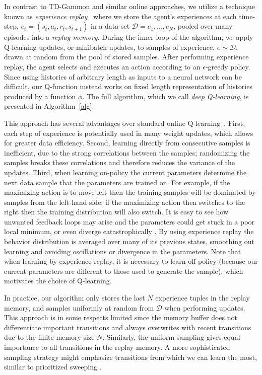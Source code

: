 \documentclass{article} %
\begin{document}
In contrast to TD-Gammon and similar online approaches, we utilize a technique known as \emph{experience replay}~\cite{lin1993reinforcement} where we store the agent's experiences at each time-step, $e_t = (s_t, a_t, r_t, s_{t+1})$ in a data-set $\mathcal{D} = e_1, ..., e_N$, pooled over many episodes into a \emph{replay memory}. During the inner loop of the algorithm, we apply Q-learning updates, or minibatch updates, to samples of experience, $e \sim \mathcal{D}$, drawn at random from the pool of stored samples. After performing experience replay, the agent selects and executes an action according to an $\epsilon$-greedy policy. Since using histories of arbitrary length as inputs to a neural network can be difficult, our Q-function instead works on fixed length representation of histories produced by a function $\phi$. The full algorithm, which we call \emph{deep Q-learning}, is presented in Algorithm~\ref{alg}.

This approach has several advantages over standard online Q-learning~\cite{sutton:book}. First, each step of experience is potentially used in many weight updates, which allows for greater data efficiency. Second, learning directly from consecutive samples is inefficient, due to the strong correlations between the samples; randomizing the samples breaks these correlations and therefore reduces the variance of the updates. Third, when learning on-policy the current parameters determine the next data sample that the parameters are trained on. For example, if the maximizing action is to move left then the training samples will be dominated by samples from the left-hand side; if the maximizing action then switches to the right then the training distribution will also switch. It is easy to see how unwanted feedback loops may arise and the parameters could get stuck in a poor local minimum, or even diverge catastrophically \cite{tsitsiklis:td-convergence}. By using experience replay the behavior distribution is averaged over many of its previous states, smoothing out learning and avoiding oscillations or divergence in the parameters. Note that when learning by experience replay, it is necessary to learn off-policy (because our current parameters are different to those used to generate the sample), which motivates the choice of Q-learning.

In practice, our algorithm only stores the last $N$ experience tuples in the replay memory, and samples uniformly at random from $\mathcal{D}$ when performing updates. This approach is in some respects limited since the memory buffer does not differentiate important transitions and always overwrites with recent transitions due to the finite memory size $N$. Similarly, the uniform sampling gives equal importance to all transitions in the replay memory. A more sophisticated sampling strategy might emphasize transitions from which we can learn the most, similar to prioritized sweeping \cite{moore:prioritized}.  %
\end{document}

